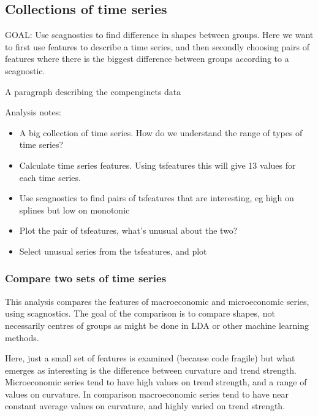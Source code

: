 \hypertarget{collections-of-time-series}{%
\subsection{Collections of time
series}\label{collections-of-time-series}}

GOAL: Use scagnostics to find difference in shapes between groups. Here
we want to first use features to describe a time series, and then
secondly choosing pairs of features where there is the biggest
difference between groups according to a scagnostic.

A paragraph describing the compenginets data

Analysis notes:

\begin{itemize}
\tightlist
\item
  A big collection of time series. How do we understand the range of
  types of time series?
\item
  Calculate time series features. Using tsfeatures this will give 13
  values for each time series.
\item
  Use scagnostics to find pairs of tsfeatures that are interesting, eg
  high on splines but low on monotonic
\item
  Plot the pair of tsfeatures, what's unusual about the two?
\item
  Select unusual series from the tsfeatures, and plot
\end{itemize}

\hypertarget{compare-two-sets-of-time-series}{%
\subsubsection{Compare two sets of time
series}\label{compare-two-sets-of-time-series}}

This analysis compares the features of macroeconomic and microeconomic
series, using scagnostics. The goal of the comparison is to compare
shapes, not necessarily centres of groups as might be done in LDA or
other machine learning methods.

Here, just a small set of features is examined (because code fragile)
but what emerges as interesting is the difference between curvature and
trend strength. Microeconomic series tend to have high values on trend
strength, and a range of values on curvature. In comparison
macroeconomic series tend to have near constant average values on
curvature, and highly varied on trend strength.

